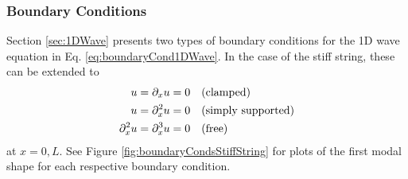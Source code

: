 
\subsubsection{Boundary Conditions}
Section \ref{sec:1DWave} presents two types of boundary conditions for the 1D wave equation in Eq. \eqref{eq:boundaryCond1DWave}. In the case of the stiff string, these can be extended to
\begin{subequations}\label{eq:stiffStringBoundConds}
    \begin{align}
        u = \partial_x u &= 0 \quad \text{(clamped)}\label{eq:BCclamped}\\
        u = \partial_x^2 u &= 0 \quad \text{(simply supported)}\label{eq:BCsimplySupported}\\
        \partial_x^2 u = \partial_x^3 u &= 0 \quad \text{(free)}\label{eq:BCfree}
    \end{align}
\end{subequations}
at $x = 0, L$. See Figure \ref{fig:boundaryCondsStiffString} for plots of the first modal shape for each respective boundary condition. 
\def\figWidth{0.32}
